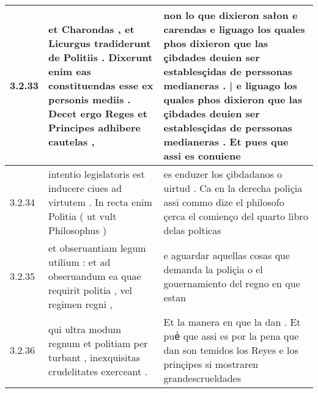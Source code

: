\begin{tabular}{|p{1cm}|p{6.5cm}|p{6.5cm}|}
3.2.33 & et Charondas , et Licurgus tradiderunt de Politiis . Dixerunt enim eas constituendas esse ex personis mediis . Decet ergo Reges et Principes adhibere cautelas , & non lo que dixieron sałon e carendas e liguago los quales phos dixieron que las çibdades deuien ser establesçidas de perssonas medianeras . | e liguago los quales phos dixieron que las çibdades deuien ser establesçidas de perssonas medianeras . Et pues que assi es conuiene \\\hline
3.2.34 & intentio legislatoris est inducere ciues ad virtutem . In recta enim Politia ( ut vult Philosophus ) & es enduzer los çibdadanos o uirtud . Ca en la derecha poliçia assi commo dize el philosofo çerca el comienço del quarto libro delas polticas \\\hline
3.2.35 & et obseruantiam legum utilium : et ad obseruandum ea quae requirit politia , vel regimen regni , & e aguardar aquellas cosas que demanda la poliçia o el gouernamiento del regno en que estan \\\hline
3.2.36 & qui ultra modum regnum et politiam per turbant , inexquisitas crudelitates exerceant . & Et la manera en que la dan . Et pueᷤ que assi es por la pena que dan son temidos los Reyes e los prinçipes si mostraren grandescrueldades \\\hline

\end{tabular}
